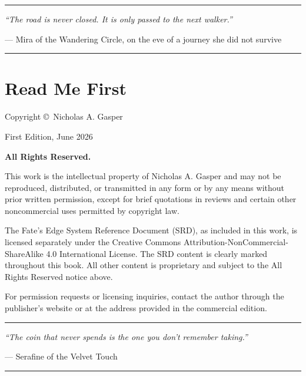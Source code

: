 \documentclass[10pt]{article}
\begin{document}
\vspace{1em}
\begin{center}
\rule{0.6\textwidth}{0.5pt}
\vspace{0.5em}
\itshape\small
``The road is never closed. It is only passed to the next walker.''
\vspace{0.3em}

--- Mira of the Wandering Circle, on the eve of a journey she did not survive
\rule{0.6\textwidth}{0.5pt}
\end{center}

\newpage

\section*{Read Me First}

Copyright \copyright\ Nicholas A. Gasper

First Edition, June 2026

\vspace{0.5cm}

\textbf{All Rights Reserved.}

This work is the intellectual property of Nicholas A. Gasper and may not be reproduced, distributed, or transmitted in any form or by any means without prior written permission, except for brief quotations in reviews and certain other noncommercial uses permitted by copyright law.

\vspace{0.3cm}

The Fate's Edge System Reference Document (SRD), as included in this work, is licensed separately under the Creative Commons Attribution-NonCommercial-ShareAlike 4.0 International License. The SRD content is clearly marked throughout this book. All other content is proprietary and subject to the All Rights Reserved notice above.

\vspace{0.3cm}

For permission requests or licensing inquiries, contact the author through the publisher's website or at the address provided in the commercial edition.

\vspace{1cm}

\begin{center}
\rule{0.4\textwidth}{0.5pt}

\textit{``The coin that never spends is the one you don't remember taking.''}

--- Serafine of the Velvet Touch

\rule{0.4\textwidth}{0.5pt}
\end{center}
\end{document}
